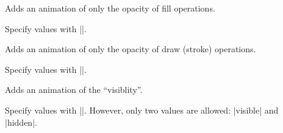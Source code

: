 \begin{command}{\pgfsys@animatefillopacity}
  Adds an animation of only the opacity of fill operations.
  
  Specify values with |\pgfsys@animation@scalar|.

\begin{codeexample}[width=2cm]
\end{codeexample}
\end{command}

\begin{command}{\pgfsys@animatestrokeopacity}
  Adds an animation of only the opacity of draw (stroke) operations.
  
  Specify values with |\pgfsys@animation@scalar|.
  
\begin{codeexample}[width=2cm]
\end{codeexample}
\end{command}

\begin{command}{\pgfsys@animatevisibility}
  Adds an animation of the ``visiblity''.
  
  Specify values with |\pgfsys@animation@text|. However, only two values are allowed:
  |visible| and |hidden|.
\begin{codeexample}[width=2cm]
\end{codeexample}
\end{command}

